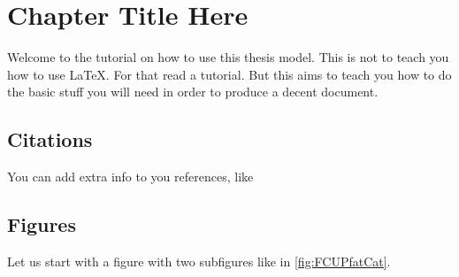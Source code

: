 

\chapter{Chapter Title Here} %
\label{ChapterX} %


Welcome to the tutorial on how to use this thesis model. This is not to teach you how to use \LaTeX. For that read a tutorial. But this aims to teach you how to do the basic stuff you will need in order to produce a decent document.

\section{Citations}
You can add extra info to you references, like \cite[chapter 3]{Nobody06}

\section{Figures}

Let us start with a figure with two subfigures like in \ref{fig:FCUPfatCat}. 

